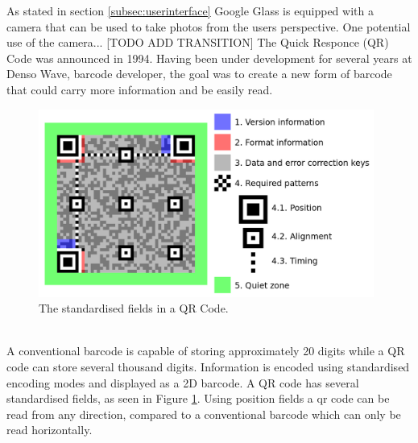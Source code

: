 As stated in section \ref{subsec:userinterface} Google Glass is equipped with a camera that can be used to take photos from the users perspective. One potential use of the camera... [TODO ADD TRANSITION] The Quick Responce (QR) Code was announced in 1994. Having been under development for several years at Denso Wave, barcode developer, the goal was to create a new form of barcode that could carry more information and be easily read.\cite{qrCodeHistory}
\\
	\begin{figure}[ht!]
		\centering
		\includegraphics[width=110mm]{images/qrcodestandard}
		\caption{The standardised fields in a QR Code.\cite{qrCodeWiki}}
		\label{qrcodestandard}
	\end{figure}
\\	
A conventional barcode is capable of storing approximately 20 digits while a QR code can store several thousand digits.\cite{qrCodeType} Information is encoded using standardised encoding modes and displayed as a 2D barcode. A QR code has several standardised fields, as seen in Figure \ref{qrcodestandard}. Using position fields a qr code can be read from any direction, compared to a conventional barcode which can only be read horizontally.\cite{qrCodeAbout}